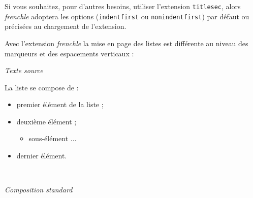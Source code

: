 \documentclass[a4paper,12pt,openright]{article}
\begin{document}
Si vous souhaitez, pour d’autres besoins, utiliser l’extension \texttt{titlesec}, alors
\textit{frenchle} adoptera les options (\texttt{indentfirst} 
ou \texttt{nonindentfirst}) par défaut ou
précisées au chargement de l’extension.

Avec l’extension \textit{frenchle} la mise en page des listes est différente au niveau
des marqueurs et des espacements verticaux :
\begin{center} %
\begin{minipage}{\textwidth}
\begin{center} %
\textit{Texte source}\\[.5ex]
\begin{boxedverbatim}
La liste se compose de :
\begin{itemize}
\item premier élément de la liste ;
\item deuxième élément ;
  \begin{itemize}
  \item sous-élément ...
  \end{itemize}
\item dernier élément.
\end{itemize}
\end{boxedverbatim}
\\[.5em]
\end{center}
\end{minipage}
\setcounter{mpfootnote}{1} %
\renewcommand{\thempfootnote}{\arabic{mpfootnote}}
\noindent
\frlabelitems{\renewcommand{\labelitemi}{--}%
\renewcommand{\labelitemii}{--}%
\renewcommand{\labelitemiii}{--}%
}
\parbox[t]{65mm}{
\begin{center} \nofrenchtypography \nofrenchlayout \english
\textit{Composition standard} \small 
\end{center}
}
\end{center}
\end{document}
